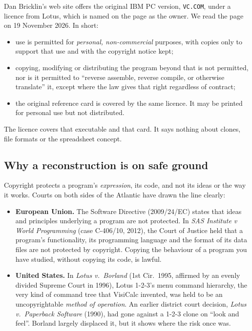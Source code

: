 \documentclass[11pt]{article}
\begin{document}
Dan Bricklin's web site offers the original IBM PC version, \texttt{VC.COM},
under a licence from Lotus, which is named on the page as the owner. We
read the page on 19 November 2026. In short:

\begin{itemize}
\item use is permitted for \emph{personal, non-commercial} purposes, with
  copies only to support that use and with the copyright notice kept;
\item copying, modifying or distributing the program beyond that is not
  permitted, nor is it permitted to ``reverse assemble, reverse compile, or
  otherwise translate'' it, except where the law gives that right
  regardless of contract;
\item the original reference card is covered by the same licence. It may
  be printed for personal use but not distributed.
\end{itemize}

The licence covers that executable and that card. It says nothing about
clones, file formats or the spreadsheet concept.

\subsection{Why a reconstruction is on safe ground}

Copyright protects a program's \emph{expression}, its code, and not its
ideas or the way it works. Courts on both sides of the Atlantic have drawn
the line clearly:

\begin{itemize}
\item \textbf{European Union.} The Software Directive (2009/24/EC) states
  that ideas and principles underlying a program are not protected. In
  \emph{SAS Institute v World Programming} (case C-406/10, 2012), the Court
  of Justice held that a program's functionality, its programming language
  and the format of its data files are not protected by copyright. Copying
  the behaviour of a program you have studied, without copying its code, is
  lawful.
\item \textbf{United States.} In \emph{Lotus v.\ Borland} (1st Cir.\ 1995,
  affirmed by an evenly divided Supreme Court in 1996), Lotus 1-2-3's menu
  command hierarchy, the very kind of \typ{/} command tree that VisiCalc
  invented, was held to be an uncopyrightable \emph{method of operation}.
  An earlier district court decision, \emph{Lotus v.\ Paperback Software}
  (1990), had gone against a 1-2-3 clone on ``look and feel''. Borland
  largely displaced it, but it shows where the risk once was.
\end{itemize}
\end{document}

